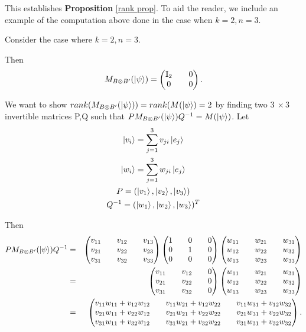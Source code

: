 This establishes {\bf{Proposition}} \ref{rank prop}. To aid the reader, we include an example of the computation above done in the case when $k=2, n=3$.
\begin{example}
Consider the case where $k=2, n=3$.

Then 
$$M_{B \otimes B'}(\ket{\psi})=\begin{pmatrix}
\mathbb{I}_2 && 0 \\
0 && 0
\end{pmatrix}.$$

We want to show $rank(M_{B \otimes B'}(\ket{\psi}))=rank(M(\ket{\psi})=2$ by finding two $3\  \times 3$ invertible matrices P,Q such that $PM_{B \otimes B'}(\ket{\psi})Q^{-1}=M(\ket{\psi})$.
Let
\begin{gather*}
\ket{v_i}=\sum_{j=1}^3 v_{ji}\ket{e_j}\\
\ket{w_i}=\sum_{j=1}^3 w_{ji}\ket{e_j}\\
P=(\ket{v_1}, \ket{v_2}, \ket{v_3})\\
Q^{-1}=(\ket{w_1}, \ket{w_2}, \ket{w_3})^T
\end{gather*}

Then
\begin{eqnarray*}
P M_{B \otimes B'}(\ket{\psi}) Q^{-1}&=&\begin{pmatrix}
v_{11} && v_{12} && v_{13}\\
v_{21} && v_{22} && v_{23}\\
v_{31} && v_{32} && v_{33}
\end{pmatrix}
\begin{pmatrix}
1 && 0 && 0\\
0 && 1 && 0\\
0 && 0 && 0\\
\end{pmatrix}
\begin{pmatrix}
w_{11} && w_{21} && w_{31}\\
w_{12} && w_{22} && w_{32}\\
w_{13} && w_{23} && w_{33}
\end{pmatrix}\\
&=&\begin{pmatrix}
v_{11} && v_{12} && 0\\
v_{21} && v_{22} && 0\\
v_{31} && v_{32} && 0
\end{pmatrix}
\begin{pmatrix}
w_{11} && w_{21} && w_{31}\\
w_{12} && w_{22} && w_{32}\\
w_{13} && w_{23} && w_{33}
\end{pmatrix}\\
&=&\begin{pmatrix}
v_{11}w_{11}+v_{12}w_{12} && v_{11}w_{21}+v_{12}w_{22} && v_{11}w_{31}+v_{12}w_{32}\\
v_{21}w_{11}+v_{22}w_{12} && v_{21}w_{21}+v_{22}w_{22} && v_{21}w_{31}+v_{22}w_{32} \\
v_{31}w_{11}+v_{32}w_{12} && v_{31}w_{21}+v_{32}w_{22} && v_{31}w_{31}+v_{32}w_{32} \\
\end{pmatrix}.
\end{eqnarray*}



\end{example}

